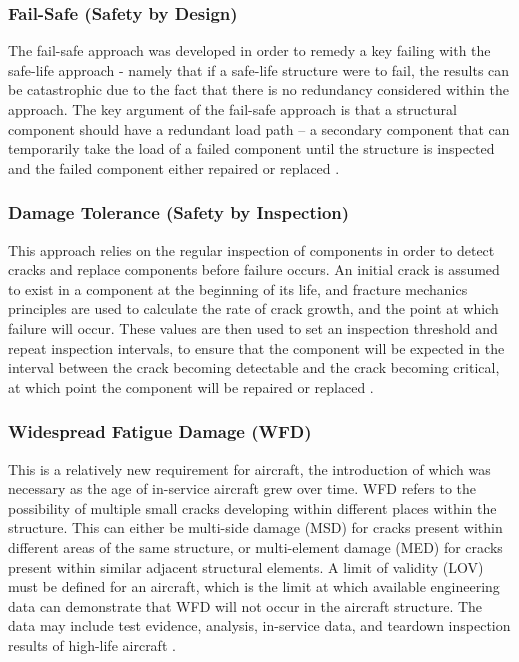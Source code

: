 \subsubsection*{Fail-Safe (Safety by Design)}
    
The fail-safe approach was developed in order to remedy a key failing with the safe-life approach {-} namely that if a safe-life structure were to fail, the results can be catastrophic due to the fact that there is no redundancy considered within the approach. The key argument of the fail-safe approach is that a structural component should have a redundant load path -- a secondary component that can temporarily take the load of a failed component until the structure is inspected and the failed component either repaired or replaced \cite{schijve_load_2009}.
 
\newpage
\subsubsection*{Damage Tolerance (Safety by Inspection)}
    
This approach relies on the regular inspection of components in order to detect cracks and replace components before failure occurs. An initial crack is assumed to exist in a component at the beginning of its life, and fracture mechanics principles are used to calculate the rate of crack growth, and the point at which failure will occur. These values are then used to set an inspection threshold and repeat inspection intervals, to ensure that the component will be expected in the interval between the crack becoming detectable and the crack becoming critical, at which point the component will be repaired or replaced \cite{schijve_load_2009}.
    
\subsubsection*{Widespread Fatigue Damage (WFD)}

This is a relatively new requirement for aircraft, the introduction of which was necessary as the age of in-service aircraft grew over time. WFD refers to the possibility of multiple small cracks developing within different places within the structure. This can either be multi-side damage (MSD) for cracks present within different areas of the same structure, or multi-element damage (MED) for cracks present within similar adjacent structural elements. A limit of validity (LOV) must be defined for an aircraft, which is the limit at which available engineering data can demonstrate that WFD will not occur in the aircraft structure. The data may include test evidence, analysis, in-service data, and teardown inspection results of high-life aircraft \cite{anderson_fracture_2017}.
    
